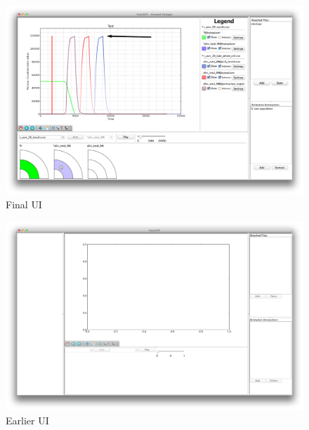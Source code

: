 \begin{figure}[h!]
    \centering
    \includegraphics[width=\textwidth]{images/main_ui.png}
    \caption{Final \ac{UI}}
    \label{fig:main_ui}
\end{figure}

\begin{figure}[h!]
    \centering
    \includegraphics[width=\textwidth]{images/old_ui.png}
    \caption{Earlier \ac{UI}}
    \label{fig:old_ui}
\end{figure}

